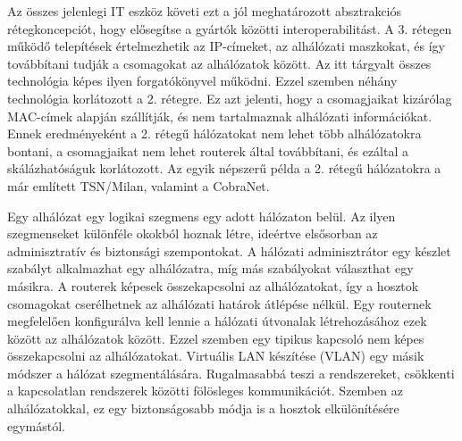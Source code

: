 Az összes jelenlegi IT eszköz követi ezt a jól
meghatározott absztrakciós rétegkoncepciót, hogy elősegítse a gyártók közötti
interoperabilitást. A 3. rétegen működő telepítések értelmezhetik az IP-címeket,
az alhálózati maszkokat, és így továbbítani tudják a csomagokat az
alhálózatok között. Az itt tárgyalt összes technológia képes ilyen
forgatókönyvel működni. Ezzel szemben néhány technológia korlátozott a 2.
rétegre. Ez azt jelenti, hogy a csomagjaikat kizárólag MAC-címek alapján
szállítják, és nem tartalmaznak alhálózati információkat. Ennek eredményeként a
2. rétegű hálózatokat nem lehet több alhálózatokra bontani, a csomagjaikat nem
lehet routerek által továbbítani, és ezáltal a skálázhatóságuk korlátozott. 
Az egyik népszerű példa a 2. rétegű hálózatokra a már említett TSN/Milan, valamint a CobraNet.

Egy alhálózat egy logikai szegmens egy adott hálózaton belül. Az ilyen szegmenseket
különféle okokból hoznak létre, ideértve elsősorban az adminisztratív és biztonsági
szempontokat. A hálózati adminisztrátor egy készlet szabályt alkalmazhat egy
alhálózatra, míg más szabályokat választhat egy másikra. A routerek képesek
összekapcsolni az alhálózatokat, így a hosztok csomagokat cserélhetnek az
alhálózati határok átlépése nélkül. Egy routernek megfelelően konfigurálva kell
lennie a hálózati útvonalak létrehozásához ezek között az alhálózatok között.
Ezzel szemben egy tipikus kapcsoló nem képes összekapcsolni az alhálózatokat.
Virtuális LAN készítése (VLAN) egy másik módszer a hálózat szegmentálására. 
Rugalmasabbá teszi a rendszereket, csökkenti a kapcsolatlan rendszerek közötti fölösleges kommunikációt.
Szemben az alhálózatokkal, ez egy biztonságosabb módja is a hosztok elkülönítésére egymástól.
